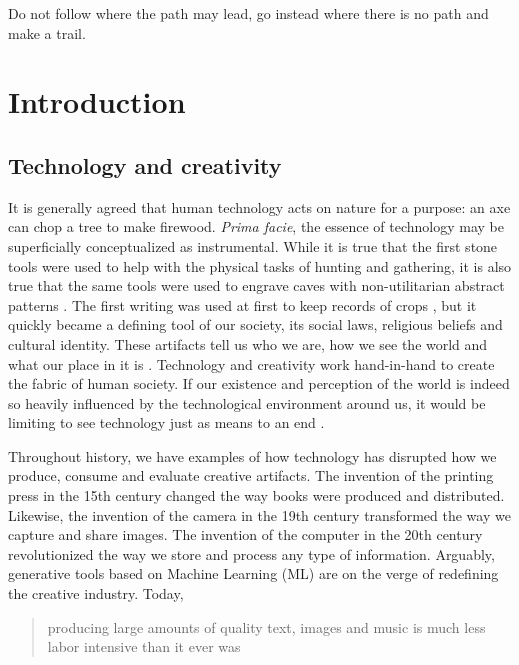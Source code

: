 \begin{savequote}[75mm]
Do not follow where the path may lead, go instead where there is no path and make a trail.
\end{savequote}



\chapter{Introduction}
\label{introduction}

\section{Technology and creativity}

It is generally agreed that human technology acts on nature for a purpose: an axe can chop a tree to make firewood. \textit{Prima facie}, the essence of technology may be superficially conceptualized as instrumental. While it is true that the first stone tools were used to help with the physical tasks of hunting and gathering, it is also true that the same tools were used to engrave caves with non-utilitarian abstract patterns \citep{RodriguezVidal2014}. The first writing was used at first to keep records of crops \citep{Hallo1971}, but it quickly became a defining tool of our society, its social laws, religious beliefs and cultural identity. These artifacts tell us who we are, how we see the world and what our place in it is \citep{Ihde1990,Rosenberger2015}. Technology and creativity work hand-in-hand to create the fabric of human society. If our existence and perception of the world is indeed so heavily influenced by the technological environment around us, it would be limiting to see technology just as means to an end \citep{Heidegger1977, Winner1980, Feenberg1991, Ihde1990}.

 Throughout history, we have examples of how technology has disrupted how we produce, consume and evaluate creative artifacts. The invention of the printing press in the 15th century changed the way books were produced and distributed. Likewise, the invention of the camera in the 19th century transformed the way we capture and share images. The invention of the computer in the 20th century revolutionized the way we store and process any type of information. Arguably, generative tools based on Machine Learning (ML) are on the verge of redefining the creative industry. Today, \blockcquote[p. 1]{Colton2020}{producing large amounts of quality text, images and music is much less labor intensive than it ever was}. 

